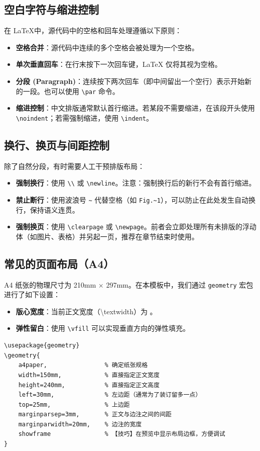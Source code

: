 \subsection{空白字符与缩进控制}
在 \LaTeX 中，源代码中的空格和回车处理遵循以下原则：
\begin{itemize}
    \item \textbf{空格合并}：源代码中连续的多个空格会被处理为一个空格。
    \item \textbf{单次垂直回车}：在行末按下一次回车键，LaTeX 仅将其视为空格。
    \item \textbf{分段 (Paragraph)}：连续按下两次回车（即中间留出一个空行）表示开始新的一段。也可以使用 \texttt{\textbackslash par} 命令。
    \item \textbf{缩进控制}：中文排版通常默认首行缩进。若某段不需要缩进，在该段开头使用 \texttt{\textbackslash noindent}；若需强制缩进，使用 \texttt{\textbackslash indent}。
\end{itemize}

\subsection{换行、换页与间距控制}

除了自然分段，有时需要人工干预排版布局：

\begin{itemize}
    \item \textbf{强制换行}：使用 \texttt{\textbackslash\textbackslash} 或 \texttt{\textbackslash newline}。注意：强制换行后的新行不会有首行缩进。
    \item \textbf{禁止断行}：使用波浪号 \texttt{\~{}} 代替空格（如 \texttt{Fig.\~{}1}），可以防止在此处发生自动换行，保持语义连贯。
    \item \textbf{强制换页}：使用 \texttt{\textbackslash clearpage} 或 \texttt{\textbackslash newpage}。前者会立即处理所有未排版的浮动体（如图片、表格）并另起一页，推荐在章节结束时使用。
\end{itemize}

\subsection{常见的页面布局（A4）}
A4 纸张的物理尺寸为 210mm $\times$ 297mm。在本模板中，我们通过 \texttt{geometry} 宏包进行了如下设置：

\begin{itemize}
    \item \textbf{版心宽度}：当前正文宽度（\textbackslash textwidth）为 \the\textwidth。
    \item \textbf{弹性留白}：使用 \texttt{\textbackslash vfill} 可以实现垂直方向的弹性填充。
\end{itemize}
\begin{lstlisting}
\usepackage{geometry}
\geometry{
    a4paper,                % 确定纸张规格
    width=150mm,            % 直接指定正文宽度
    height=240mm,           % 直接指定正文高度
    left=30mm,              % 左边距（通常为了装订留多一点）
    top=25mm,               % 上边距
    marginparsep=3mm,       % 正文与边注之间的间距
    marginparwidth=20mm,    % 边注的宽度
    showframe               % 【技巧】在预览中显示布局边框，方便调试
}    
\end{lstlisting}
